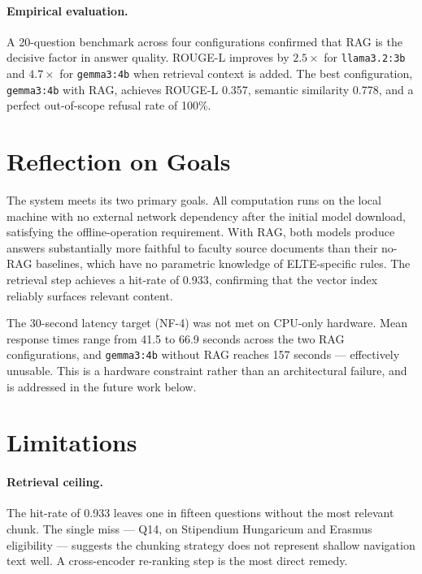 \paragraph{Empirical evaluation.}
A 20-question benchmark across four configurations confirmed that RAG is the
decisive factor in answer quality. ROUGE-L improves by $2.5\times$ for
\texttt{llama3.2:3b} and $4.7\times$ for \texttt{gemma3:4b} when retrieval
context is added. The best configuration, \texttt{gemma3:4b} with RAG, achieves
ROUGE-L 0.357, semantic similarity 0.778, and a perfect out-of-scope refusal
rate of 100\%.

\section{Reflection on Goals}
\label{sec:sum-reflection}

The system meets its two primary goals. All computation runs on the local
machine with no external network dependency after the initial model download,
satisfying the offline-operation requirement. With RAG, both models produce
answers substantially more faithful to faculty source documents than their
no-RAG baselines, which have no parametric knowledge of ELTE-specific rules.
The retrieval step achieves a hit-rate of 0.933, confirming that the vector
index reliably surfaces relevant content.

The 30-second latency target (NF-4) was not met on CPU-only hardware. Mean
response times range from 41.5 to 66.9 seconds across the two RAG
configurations, and \texttt{gemma3:4b} without RAG reaches 157 seconds ---
effectively unusable. This is a hardware constraint rather than an
architectural failure, and is addressed in the future work below.

\section{Limitations}
\label{sec:sum-limitations}

\paragraph{Retrieval ceiling.}
The hit-rate of 0.933 leaves one in fifteen questions without the most relevant
chunk. The single miss --- Q14, on Stipendium Hungaricum and Erasmus
eligibility --- suggests the chunking strategy does not represent shallow
navigation text well. A cross-encoder re-ranking step is the most direct
remedy.

